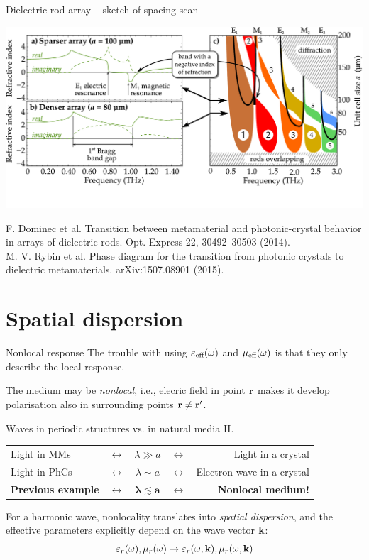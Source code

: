 \documentclass[t]{beamer} \usepackage[english]{babel} \usepackage[utf8]{inputenc} \usetheme{Frankfurt} %
\begin{document}
\begin{frame}{Dielectric rod array -- sketch of spacing scan}	%

\includegraphics[width=\textwidth]{../img/ERods_forSeefeld_sparserN_denserN_DrawnBands.pdf}

\vfill
\tiny{F. Dominec et al. Transition between metamaterial and photonic-crystal behavior in arrays of dielectric rods. Opt. Express 22, 30492--30503 (2014).\\
M. V. Rybin et al. Phase diagram for the transition from photonic crystals to dielectric metamaterials. arXiv:1507.08901 (2015).}
\end{frame} 		%

\section{Spatial dispersion}
\begin{frame}{Nonlocal response}%
The trouble with using $\varepsilon_{\text{eff} }(\omega)$ and $\mu_{\text{eff} }(\omega)$ is that they only describe the local response. \vspace{.5em}

The medium may be \textit{nonlocal}, i.e., elecric field in point ${\mathbf{r}}$ makes it develop polarisation also in surrounding points ${\mathbf{r}}\neq{\mathbf{r}}'$.
	
\begin{exampleblock}{Waves in periodic structures vs. in natural media II.}
\centering \begin{tabular}{lcccr}
Light in MMs    &$\leftrightarrow$  &$\lambda \gg a$ &$\leftrightarrow$ 	& Light in a crystal         	\\
Light in PhCs   &$\leftrightarrow$  &$\lambda \sim a$ &$\leftrightarrow$ 	& Electron wave in a crystal 	\\
	\textbf{Previous example}  &$\leftrightarrow$  &$\mathbf{\pmb{\lambda\lesssim a}}$ &$\leftrightarrow$ 	& \textbf{Nonlocal medium!}\\
\end{tabular}
\end{exampleblock}

For a harmonic wave, nonlocality translates into \textit{spatial dispersion}, and the effective parameters explicitly depend on the wave vector ${\mathbf{k}}$: 
$$\varepsilon_r(\omega), \mu_r(\omega) \rightarrow  \varepsilon_r(\omega,{\mathbf{k}}), \mu_r(\omega,{\mathbf{k}})$$
\end{frame} %
\end{document}
